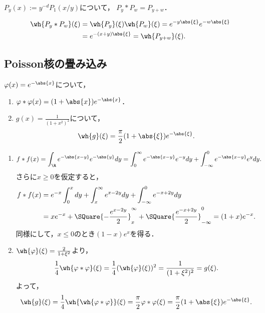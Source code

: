 \documentclass[uplatex,dvipdfmx]{jsreport}
\begin{document}
\begin{proposition}[Poisson核の半群性]
    $P_y(x):=y^{-d}P_1(x/y)$について，
    $P_y*P_w=P_{y+w}$．
\end{proposition}
\begin{Proof}
    \begin{align*}
        \wh{P_y*P_w}(\xi)&=\wh{P_y}(\xi)\wh{P_w}(\xi)=e^{-y\abs{\xi}}e^{-w\abs{\xi}}\\
        &=e^{-(x+y)\abs{\xi}}=\wh{P_{y+w}}(\xi).
    \end{align*}
\end{Proof}

\subsection{Poisson核の畳み込み}

\begin{proposition}
    $\varphi(x)=e^{-\abs{x}}$について，
    \begin{enumerate}
        \item $\varphi*\varphi(x)=(1+\abs{x})e^{-\abs{x}}$．
        \item $g(x)=\frac{1}{(1+x^2)^2}$について，
        \[\wh{g}(\xi)=\frac{\pi}{2}(1+\abs{\xi})e^{-\abs{\xi}}.\]
    \end{enumerate}
\end{proposition}
\begin{Proof}\mbox{}
    \begin{enumerate}
        \item \begin{align*}
            f*f(x)&=\int_\R e^{-\abs{x-y}}e^{-\abs{y}}dy=\int^\infty_0e^{-\abs{x-y}}e^{-y}dy+\int^0_{-\infty}e^{-\abs{x-y}}e^{y}dy.
        \end{align*}
        さらに$x\ge0$を仮定すると，
        \begin{align*}
            f*f(x)&=e^{-x}\int^x_0dy+\int^\infty_xe^{x-2y}dy+\int^0_{-\infty}e^{-x+2y}dy\\
            &=xe^{-x}+\SQuare{-\frac{e^{x-2y}}{2}}^\infty_x+\SQuare{\frac{e^{-x+2y}}{2}}^0_{-\infty}=(1+x)e^{-x}.
        \end{align*}
        同様にして，$x\le0$のとき$(1-x)e^{x}$を得る．
        \item $\wh{\varphi}(\xi)=\frac{2}{1+\xi^2}$より，
        \[\frac{1}{4}\wh{\varphi*\varphi}(\xi)=\frac{1}{4}(\wh{\varphi}(\xi))^2=\frac{1}{(1+\xi^2)^2}=g(\xi).\]
        よって，
        \[\wh{g}(\xi)=\frac{1}{4}\wh{\wh{\varphi*\varphi}}(\xi)=\frac{\pi}{2}\varphi*\varphi(\xi)=\frac{\pi}{2}(1+\abs{\xi})e^{-\abs{\xi}}.\]
    \end{enumerate}
\end{Proof}
\end{document}
